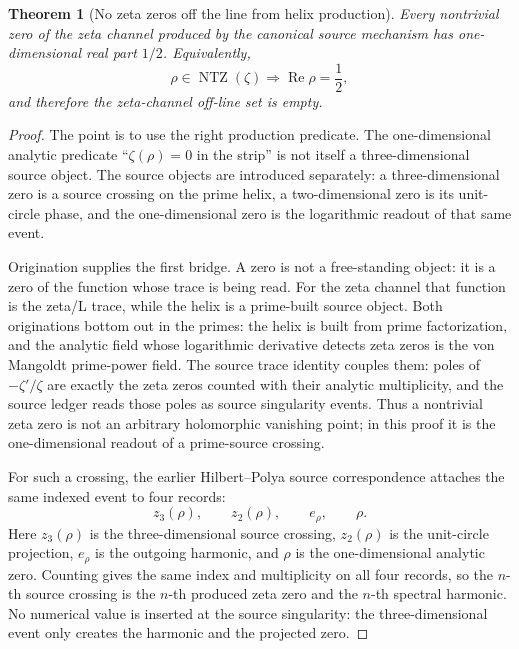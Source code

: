 \documentclass[11pt]{article}
\newtheorem{theorem}[definition]{Theorem}
\DeclareMathOperator{\Ree}{Re}
\DeclareMathOperator{\NTZ}{NTZ}
\begin{document}
\begin{theorem}[No zeta zeros off the line from helix production]
Every nontrivial zero of the zeta channel produced by the canonical source
mechanism has one-dimensional real part $1/2$.  Equivalently,
\[
  \rho\in\NTZ(\zeta)
  \Longrightarrow
  \Ree\rho=\frac12,
\]
and therefore the zeta-channel off-line set is empty.
\end{theorem}

\begin{proof}
The point is to use the right production predicate.  The one-dimensional
analytic predicate ``$\zeta(\rho)=0$ in the strip'' is not itself a
three-dimensional source object.  The source objects are introduced separately:
a three-dimensional zero is a source crossing on the prime helix, a
two-dimensional zero is its unit-circle phase, and the one-dimensional zero is
the logarithmic readout of that same event.

Origination supplies the first bridge.  A zero is not a free-standing object:
it is a zero of the function whose trace is being read.  For the zeta channel
that function is the zeta/L trace, while the helix is a prime-built source
object.  Both originations bottom out in the primes: the helix is built from
prime factorization, and the analytic field whose logarithmic derivative
detects zeta zeros is the von Mangoldt prime-power field.  The source trace
identity couples them: poles of $-\zeta'/\zeta$ are exactly the zeta zeros
counted with their analytic multiplicity, and the source ledger reads those
poles as source singularity events.  Thus a nontrivial zeta zero is not an
arbitrary holomorphic vanishing point; in this proof it is the one-dimensional
readout of a prime-source crossing.

For such a crossing, the earlier Hilbert--Polya source correspondence attaches
the same indexed event to four records:
\[
  z_3(\rho),\qquad z_2(\rho),\qquad e_\rho,
  \qquad \rho .
\]
Here $z_3(\rho)$ is the three-dimensional source crossing, $z_2(\rho)$ is the
unit-circle projection, $e_\rho$ is the outgoing harmonic, and $\rho$ is the
one-dimensional analytic zero.  Counting gives the same index and multiplicity
on all four records, so the $n$-th source crossing is the $n$-th produced
zeta zero and the $n$-th spectral harmonic.  No numerical value is inserted at
the source singularity: the three-dimensional event only creates the harmonic
and the projected zero.


\end{proof}
\end{document}
